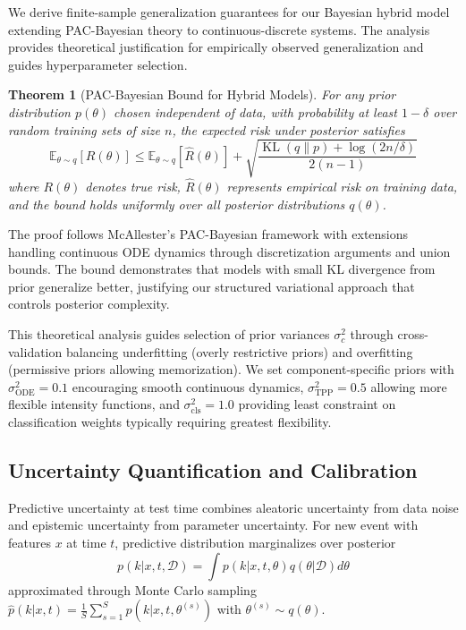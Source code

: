 \documentclass[10pt,journal,compsoc]{IEEEtran}
\DeclareMathOperator{\KL}{KL}
\newtheorem{theorem}{Theorem}
\begin{document}
We derive finite-sample generalization guarantees for our Bayesian hybrid model extending PAC-Bayesian theory to continuous-discrete systems. The analysis provides theoretical justification for empirically observed generalization and guides hyperparameter selection.

\begin{theorem}[PAC-Bayesian Bound for Hybrid Models]
For any prior distribution $p(\theta)$ chosen independent of data, with probability at least $1 - \delta$ over random training sets of size $n$, the expected risk under posterior satisfies
\begin{equation}
\mathbb{E}_{\theta \sim q}[R(\theta)] \leq \mathbb{E}_{\theta \sim q}[\hat{R}(\theta)] + \sqrt{\frac{\KL(q \| p) + \log(2n/\delta)}{2(n-1)}}
\end{equation}
where $R(\theta)$ denotes true risk, $\hat{R}(\theta)$ represents empirical risk on training data, and the bound holds uniformly over all posterior distributions $q(\theta)$.
\end{theorem}

The proof follows McAllester's PAC-Bayesian framework with extensions handling continuous ODE dynamics through discretization arguments and union bounds. The bound demonstrates that models with small KL divergence from prior generalize better, justifying our structured variational approach that controls posterior complexity.

This theoretical analysis guides selection of prior variances $\sigma_c^2$ through cross-validation balancing underfitting (overly restrictive priors) and overfitting (permissive priors allowing memorization). We set component-specific priors with $\sigma_{\text{ODE}}^2 = 0.1$ encouraging smooth continuous dynamics, $\sigma_{\text{TPP}}^2 = 0.5$ allowing more flexible intensity functions, and $\sigma_{\text{cls}}^2 = 1.0$ providing least constraint on classification weights typically requiring greatest flexibility.

\subsection{Uncertainty Quantification and Calibration}

Predictive uncertainty at test time combines aleatoric uncertainty from data noise and epistemic uncertainty from parameter uncertainty. For new event with features $x$ at time $t$, predictive distribution marginalizes over posterior
\begin{equation}
p(k | x, t, \mathcal{D}) = \int p(k | x, t, \theta) q(\theta | \mathcal{D}) d\theta
\end{equation}
approximated through Monte Carlo sampling $\hat{p}(k | x, t) = \frac{1}{S}\sum_{s=1}^S p(k | x, t, \theta^{(s)})$ with $\theta^{(s)} \sim q(\theta)$.
\end{document}

